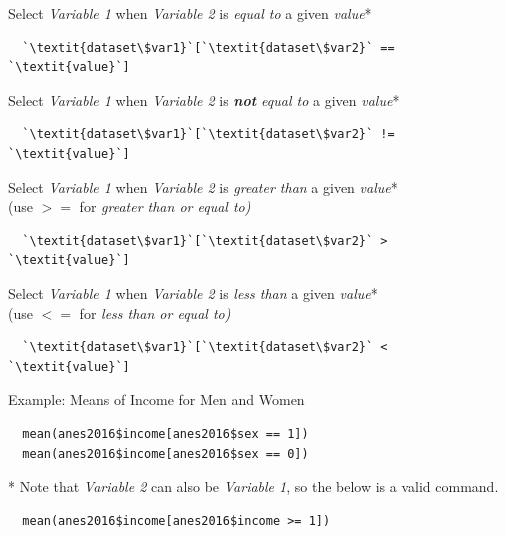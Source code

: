 \documentclass[12pt,letterpaper]{article}
\newcommand{\ind}{\phantom{AA}}
\begin{document}
\begin{tcolorbox}[title = Subsetting Data]

Select \textit{Variable 1} when \textit{Variable 2} is \textit{equal to} a given \textit{value}*
\begin{lstlisting}
  `\textit{dataset\$var1}`[`\textit{dataset\$var2}` == `\textit{value}`]
\end{lstlisting}

Select \textit{Variable 1} when \textit{Variable 2} is \textit{\textbf{not} equal to} a given \textit{value}*
\begin{lstlisting}
  `\textit{dataset\$var1}`[`\textit{dataset\$var2}` != `\textit{value}`]
\end{lstlisting}

Select \textit{Variable 1} when \textit{Variable 2} is \textit{greater than} a given \textit{value}* \\
\ind \small{(use \textit{$>=$} for \textit{greater than or equal to)}}
\begin{lstlisting}
  `\textit{dataset\$var1}`[`\textit{dataset\$var2}` > `\textit{value}`]
\end{lstlisting}
\end{tcolorbox}

\begin{tcolorbox}[title = Subsetting Data (cont.)]

Select \textit{Variable 1} when \textit{Variable 2} is \textit{less than} a given \textit{value}* \\
\ind \small{(use \textit{$<=$} for \textit{less than or equal to)}}
\begin{lstlisting}
  `\textit{dataset\$var1}`[`\textit{dataset\$var2}` < `\textit{value}`]
\end{lstlisting}

Example: Means of Income for Men and Women
\begin{lstlisting}
  mean(anes2016$income[anes2016$sex == 1])
  mean(anes2016$income[anes2016$sex == 0])
\end{lstlisting}

\vspace{1em}

\small{* Note that \textit{Variable 2} can also be \textit{Variable 1}, so the below is a valid command.}
\begin{lstlisting}
  mean(anes2016$income[anes2016$income >= 1])
\end{lstlisting}

\end{tcolorbox}
\end{document}
